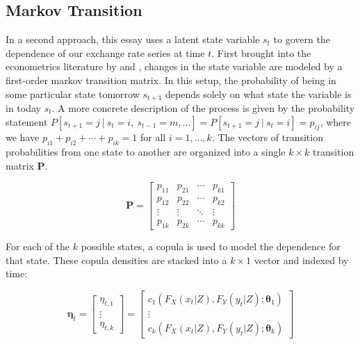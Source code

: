 \documentclass[12pt]{article}
\begin{document}
\subsection{Markov Transition}

In a second approach, this essay uses a latent state variable $s_{t}$ to govern the dependence of our exchange rate series at time $t$. First brought into the econometrics literature by \cite{Hamilton_1989} and \cite{Hamilton_1994}, changes in the state variable are modeled by a first-order markov transition matrix. In this setup, the probability of being in some particular state tomorrow $s_{t+1}$ depends solely on what state the variable is in today $s_{t}$. A more concrete description of the process is given by the probability statement $P\left[s_{t + 1} = j~|~s_{t}=i,~s_{t-1} = m,\ldots \right] = P\left[s_{t+1}=j~|~s_{t} = i\right] = p_{ij}$, where we have $p_{i1} + p_{i2} + \cdots + p_{ik}=1$ for all $i = 1,...,k$. The vectors of transition probabilities from one state to another are organized into a single $k\times k$ transition matrix $\mathbf{P}$.

\begin{equation}
\mathbf{P}=\left[ 
\begin{array}{cccc}
p_{11} & p_{21} & \cdots & p_{k1} \\ 
p_{12} & p_{22} & \cdots & p_{k2} \\ 
\vdots & \vdots & \ddots & \vdots \\ 
p_{1k} & p_{2k} & \cdots & p_{kk}
\end{array}
\right]
\end{equation}

For each of the $k$ possible states, a copula is used to model the dependence for that state. These copula densities are stacked into a $k\times 1$ vector and indexed by time:

\begin{equation}
\boldsymbol{\eta}_{t} = \left[ 
\begin{array}{c}
\eta _{t,1} \\ 
\vdots \\ 
\eta _{t,k}
\end{array}
\right] = \left[
\begin{array}{c}
c_{1}\left(F_{X}\left(x_{t} | Z\right), F_{Y}\left(y_{t} | Z\right) ;\mathbf{\theta}_{1}\right) \\ 
\vdots \\ 
c_{k}\left(F_{X}\left(x_{t} | Z\right), F_{Y}\left(y_{t} | Z\right) ;\mathbf{\theta }_{k}\right)
\end{array}
\right]
\end{equation}
\end{document}
